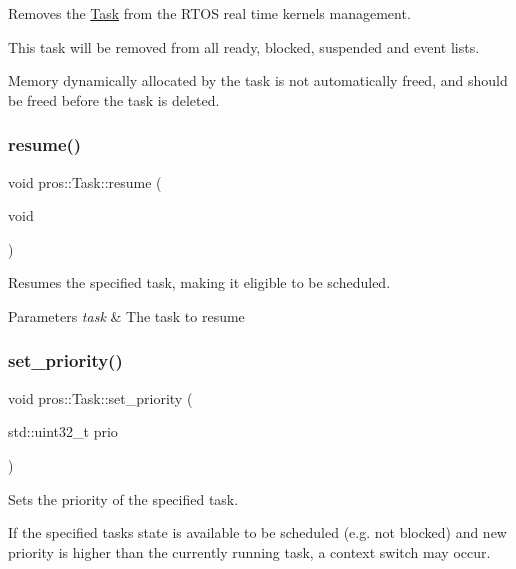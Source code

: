 Removes the \mbox{\hyperlink{classpros_1_1Task}{Task}} from the R\+T\+OS real time kernel\textquotesingle{}s management. 

This task will be removed from all ready, blocked, suspended and event lists.

Memory dynamically allocated by the task is not automatically freed, and should be freed before the task is deleted. \mbox{\label{classpros_1_1Task_ada2c08d04b39f11582cea90b59b8f317}} 
\subsubsection{\texorpdfstring{resume()}{resume()}}
{\footnotesize\ttfamily void pros\+::\+Task\+::resume (\begin{DoxyParamCaption}\item[{void}]{ }\end{DoxyParamCaption})}



Resumes the specified task, making it eligible to be scheduled. 


\begin{DoxyParams}{Parameters}
{\em task} & The task to resume \\
\hline
\end{DoxyParams}
\mbox{\label{classpros_1_1Task_a205a9937d34311ba10f540bc58d0b0b9}} 
\subsubsection{\texorpdfstring{set\_priority()}{set\_priority()}}
{\footnotesize\ttfamily void pros\+::\+Task\+::set\+\_\+priority (\begin{DoxyParamCaption}\item[{std\+::uint32\+\_\+t}]{prio }\end{DoxyParamCaption})}



Sets the priority of the specified task. 

If the specified task\textquotesingle{}s state is available to be scheduled (e.\+g. not blocked) and new priority is higher than the currently running task, a context switch may occur.


